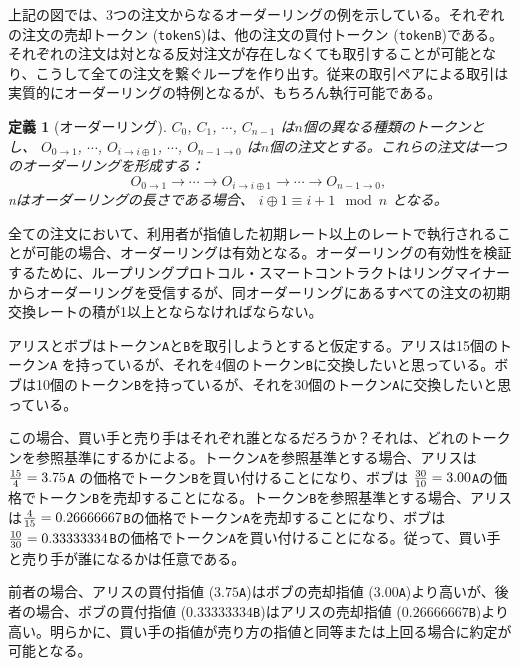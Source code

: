 \documentclass{article}
\newtheorem{definition}{定義}[section]
\begin{document}
\begin{multicols}{2}
上記の図では、3つの注文からなるオーダーリングの例を示している。それぞれの注文の売却トークン (\verb|tokenS|)は、他の注文の買付トークン (\verb|tokenB|)である。それぞれの注文は対となる反対注文が存在しなくても取引することが可能となり、こうして全ての注文を繋ぐループを作り出す。従来の取引ペアによる取引は実質的にオーダーリングの特例となるが、もちろん執行可能である。


\begin{definition}[オーダーリング]$C_{0}$, $C_{1}$, $\cdots$, $C_{n-1}$ は$n$個の異なる種類のトークンとし、 $O_{0\rightarrow 1}$, $\cdots$, $O_{i\rightarrow i\oplus 1}$, $\cdots$, $O_{n-1 \rightarrow 0}$ は$n$個の注文とする。これらの注文は一つのオーダーリングを形成する：
$$O_{0\rightarrow 1} \rightarrow \cdots \rightarrow O_{i\rightarrow i\oplus 1} \rightarrow \cdots \rightarrow O_{n-1\rightarrow 0} \text{, }$$
nはオーダーリングの長さである場合、 $i\oplus 1 \equiv i+1 \mod n$ となる。
\end{definition}

全ての注文において、利用者が指値した初期レート以上のレートで執行されることが可能の場合、オーダーリングは有効となる。オーダーリングの有効性を検証するために、ループリングプロトコル・スマートコントラクトはリングマイナーからオーダーリングを受信するが、同オーダーリングにあるすべての注文の初期交換レートの積が1以上とならなければならない。

アリスとボブはトークン\verb|A|と\verb|B|を取引しようとすると仮定する。アリスは15個のトークン\verb|A| を持っているが、それを4個のトークン\verb|B|に交換したいと思っている。ボブは10個のトークン\verb|B|を持っているが、それを30個のトークン\verb|A|に交換したいと思っている。

この場合、買い手と売り手はそれぞれ誰となるだろうか？それは、どれのトークンを参照基準にするかによる。トークン\verb|A|を参照基準とする場合、アリスは ${15 \over 4} = 3.75$\verb|A| の価格でトークン\verb|B|を買い付けることになり、ボブは ${30 \over 10} = 3.00$\verb|A|の価格でトークン\verb|B|を売却することになる。トークン\verb|B|を参照基準とする場合、アリスは${4\over 15}=0.26666667$\verb|B|の価格でトークン\verb|A|を売却することになり、ボブは${10 \over 30}=0.33333334$\verb|B|の価格でトークン\verb|A|を買い付けることになる。従って、買い手と売り手が誰になるかは任意である。

前者の場合、アリスの買付指値 ($3.75$\verb|A|)はボブの売却指値 ($3.00$\verb|A|)より高いが、後者の場合、ボブの買付指値 ($0.33333334$\verb|B|)はアリスの売却指値 ($0.26666667$\verb|B|)より高い。明らかに、買い手の指値が売り方の指値と同等または上回る場合に約定が可能となる。


\end{multicols}
\end{document}
